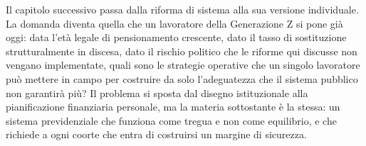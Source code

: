 \medskip
\noindent
Il capitolo successivo passa dalla riforma di sistema alla sua versione
individuale. La domanda diventa quella che un lavoratore della Generazione Z
si pone già oggi: data l'età legale di pensionamento crescente, dato il
tasso di sostituzione strutturalmente in discesa, dato il rischio politico
che le riforme qui discusse non vengano implementate, quali sono le
strategie operative che un singolo lavoratore può mettere in campo per
costruire da solo l'adeguatezza che il sistema pubblico non garantirà più?
Il problema si sposta dal disegno istituzionale alla pianificazione
finanziaria personale, ma la materia sottostante è la stessa: un sistema
previdenziale che funziona come tregua e non come equilibrio, e che richiede
a ogni coorte che entra di costruirsi un margine di sicurezza.
